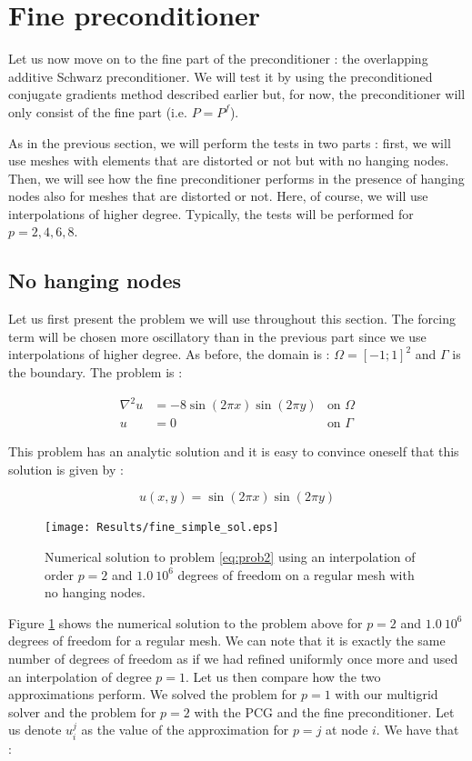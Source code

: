 \section{Fine preconditioner}
Let us now move on to the fine part of the preconditioner : the overlapping additive Schwarz preconditioner. We will test it by using the preconditioned conjugate gradients method described earlier but, for now, the preconditioner will only consist of the fine part (i.e. $P = P^f$).

As in the previous section, we will perform the tests in two parts : first, we will use meshes with elements that are distorted or not but with no hanging nodes. Then, we will see how the fine preconditioner performs in the presence of hanging nodes also for meshes that are distorted or not. Here, of course, we will use interpolations of higher degree. Typically, the tests will be performed for $p=2,4,6,8$.

\subsection{No hanging nodes}

Let us first present the problem we will use throughout this section. The forcing term will be chosen more oscillatory than in the previous part since we use interpolations of higher degree. As before, the domain is : $\Omega = [-1;1]^2$ and $\Gamma$ is the boundary. The problem is : 

\begin{align}
\nabla^2 u &= -8\sin(2\pi x)\sin(2\pi y) &\text{on $\Omega$} \label{eq:prob2}\\
u &= 0  &\text{on $\Gamma$}
\end{align}

This problem has an analytic solution and it is easy to convince oneself that this solution is given by : 

$$ u(x,y) = \sin(2\pi x)\sin(2\pi y)$$

\begin{figure}
\centering
\texttt{[image: Results/fine\_simple\_sol.eps]}
\caption{Numerical solution to problem \ref{eq:prob2} using an interpolation of order $p=2$ and $1.0\:10^6$ degrees of freedom on a regular mesh with no hanging nodes.}
\label{fine_simple_sol}
\end{figure}

Figure \ref{fine_simple_sol} shows the numerical solution to the problem above for $p=2$ and $1.0\:10^6$ degrees of freedom for a regular mesh. We can note that it is exactly the same number of degrees of freedom as if we had refined uniformly once more and used an interpolation of degree $p=1$. Let us then compare how the two approximations perform. We solved the problem for $p=1$ with our multigrid solver and the problem for $p=2$ with the PCG and the fine preconditioner. Let us denote $u^j_i$ as the value of the approximation for $p=j$ at node $i$. We have that : 


